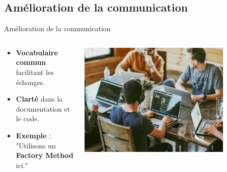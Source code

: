 \documentclass[aspectratio=169]{beamer}
\begin{document}
\subsection{Amélioration de la communication}

\begin{frame}{Amélioration de la communication}
    \begin{columns}
        \begin{column}{0.6\textwidth}
            \begin{itemize}
                \item \textbf{Vocabulaire commun} facilitant les échanges.
                \item \textbf{Clarté} dans la documentation et le code.
                \pause
                \item \textbf{Exemple} : "Utilisons un \textbf{Factory Method} ici."
            \end{itemize}
        \end{column}
        \begin{column}{0.4\textwidth}
            \begin{center}
                \includegraphics[width=0.8\textwidth]{pic/communication.png}
            \end{center}
        \end{column}
    \end{columns}
\end{frame}
\end{document}
